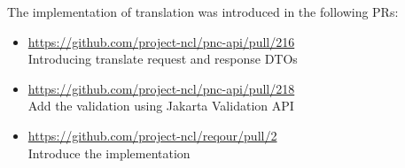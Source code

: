 \documentclass[../main.text]{subfiles}
\begin{document}
The implementation of translation was introduced in the following PRs:
\begin{itemize}
    \item \url{https://github.com/project-ncl/pnc-api/pull/216}\\
    Introducing translate request and response DTOs

    \item \url{https://github.com/project-ncl/pnc-api/pull/218}\\
    Add the validation using Jakarta Validation API

    \item \url{https://github.com/project-ncl/reqour/pull/2}\\
    Introduce the implementation
\end{itemize}
\end{document}
